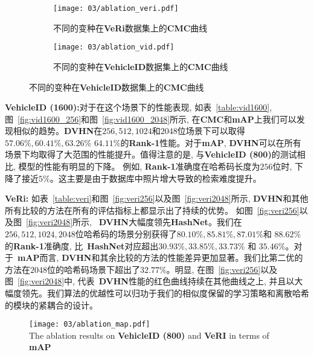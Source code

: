 \begin{figure}[!htp]
    \centering
    \begin{subfigure}{\textwidth}
      \centering
      \texttt{[image: 03/ablation\_veri.pdf]}
      \caption{不同的变种在\textbf{VeRi}数据集上的\textbf{CMC}曲线}
    \end{subfigure}
    \hspace{1cm}
    \begin{subfigure}{\textwidth}
      \centering
      \texttt{[image: 03/ablation\_vid.pdf]}
      \caption{不同的变种在\textbf{VehicleID}数据集上的\textbf{CMC}曲线}
    \end{subfigure}
    \label{fig:ablationcmc}
  \end{figure}

\textbf{VehicleID (1600):}对于在这个场景下的性能表现, 如表~\ref{table:vid1600}, 图~\ref{fig:vid1600_256}和图~\ref{fig:vid1600_2048}所示, 在\textbf{CMC}和\textbf{mAP}上我们可以发现相似的趋势。\textbf{DVHN}在$256, 512, 1024$和$2048$位场景下可以取得$57.06\%, 60.41\%, 63.26\% $ $64.11\%$的\textbf{Rank-1}性能。对于\textbf{mAP}, \textbf{DVHN}可以在所有场景下均取得了大范围的性能提升。值得注意的是, 与\textbf{VehicleID (800)}的测试相比, 模型的性能有明显的下降。 例如, \textbf{Rank-1}准确度在哈希码长度为$256$位时, 下降了接近$5 \%$。这主要是由于数据库中照片增大导致的检索难度提升。 \par
\textbf{VeRi: }如表~\ref{table:veri}和图~\ref{fig:veri256}以及图~\ref{fig:veri2048}所示, \textbf{DVHN}和其他所有比较的方法在所有的评估指标上都显示出了持续的优势。 如图~\ref{fig:veri256}以及图~\ref{fig:veri2048}所示, ~\textbf{DVHN}大幅度领先\textbf{HashNet}。我们在$256,512,1024,2048$位哈希码的场景分别获得了$80.10\%, 85.81\%, 87.01\% $和 $88.62\%$的\textbf{Rank-1}准确度, 比~\textbf{HashNet}对应超出$30.93\%, 33.85\%, 33.73\%$ 和 $35.46\%$。对于~\textbf{mAP}而言, \textbf{DVHN}和其余比较的方法的性能差异更加显著。我们比第二优的方法在$2048$位的哈希码场景下超出了$32.77 \%$。明显, 在图~\ref{fig:veri256}以及图~\ref{fig:veri2048}中, 代表~\textbf{DVHN}性能的红色曲线持续在其他曲线之上, 并且以大幅度领先。我们算法的优越性可以归功于我们的相似度保留的学习策略和离散哈希的模块的紧耦合的设计。

\begin{figure}[!htp]
    \centering
    \texttt{[image: 03/ablation\_map.pdf]} \\
      {The ablation results on \textbf{VehicleID (800)} and \textbf{VeRI} in terms of \textbf{mAP}}
   \label{fig:ablationmap}
\end{figure}

